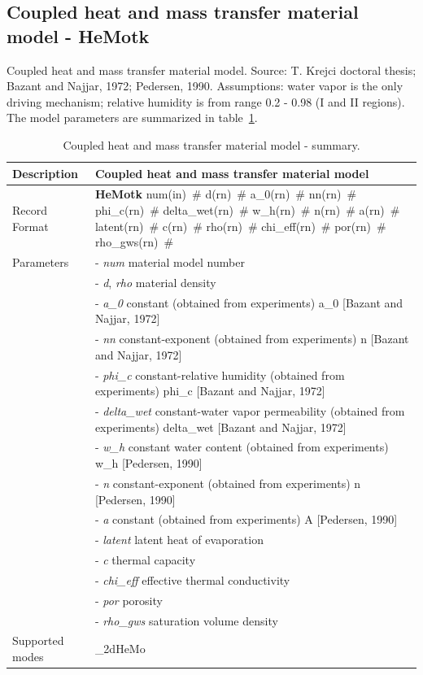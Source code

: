 \documentclass[a4paper]{article}
\newcommand{\descitem}[1]{{\noindent \bf #1}}
\newcommand{\elemparam}[2]{{{#1\tiny (#2)}~\#}}
\newcommand{\param}[1]{{\it #1}}
\begin{document}
\subsection{Coupled heat and mass transfer material model - HeMotk}
Coupled heat and mass transfer material model.
Source: T. Krejci doctoral thesis; Bazant and Najjar, 1972;
Pedersen, 1990. Assumptions: water vapor is the only driving
mechanism; relative humidity is from range 0.2 - 0.98 (I and II
regions). The model parameters are summarized
in table~\ref{hemotk_table}.
\begin{table}[!htb]
\begin{tabular}{|l|p{9cm}|}
\hline
Description & Coupled heat and mass transfer material model\\
\hline
Record Format & \descitem{HeMotk} \elemparam{num}{in}
\elemparam{d}{rn} \elemparam{a\_0}{rn} \elemparam{nn}{rn}
\elemparam{phi\_c}{rn} \elemparam{delta\_wet}{rn}
\elemparam{w\_h}{rn} \elemparam{n}{rn}
\elemparam{a}{rn} \elemparam{latent}{rn}
\elemparam{c}{rn} \elemparam{rho}{rn}
\elemparam{chi\_eff}{rn} \elemparam{por}{rn}
\elemparam{rho\_gws}{rn}\\
Parameters &- \param{num} material model number\\
&- \param{d}, \param{rho} material density\\
&- \param{a\_0} constant (obtained from experiments) a\_0 [Bazant and Najjar, 1972]\\
&- \param{nn} constant-exponent (obtained from experiments) n [Bazant
and Najjar, 1972]\\
&- \param{phi\_c} constant-relative humidity  (obtained from experiments) phi\_c [Bazant and Najjar, 1972]\\
&- \param{delta\_wet} constant-water vapor permeability (obtained from
experiments) delta\_wet [Bazant and Najjar, 1972]\\
&- \param{w\_h} constant water content (obtained from experiments) w\_h
[Pedersen, 1990]\\
&- \param{n} constant-exponent (obtained from experiments) n [Pedersen, 1990]\\
&- \param{a} constant (obtained from experiments) A [Pedersen, 1990]\\
&- \param{latent} latent heat of evaporation\\
&- \param{c} thermal capacity\\
&- \param{chi\_eff} effective thermal conductivity\\
&- \param{por} porosity\\
&- \param{rho\_gws} saturation volume density\\
Supported modes& \_2dHeMo\\
\hline
\end{tabular}
\caption{Coupled heat and mass transfer material model - summary.}
\label{hemotk_table}
\end{table}
\end{document}
